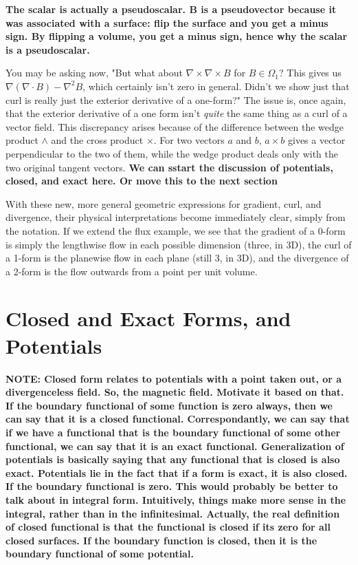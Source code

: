 \documentclass{book}
\begin{document}
\textbf{The scalar is actually a pseudoscalar. B is a pseudovector because it was associated with a surface: flip the surface and you get a minus sign. By flipping a volume, you get a minus sign, hence why the scalar is a pseudoscalar.}

You may be asking now, "But what about $\nabla \times \nabla \times B$ for $B \in \Omega_1$? This gives us $\nabla (\nabla \cdot B) - \nabla^2 B$, which certainly isn't zero in general. Didn't we show just that curl is really just the exterior derivative of a one-form?" The issue is, once again, that the exterior derivative of a one form isn't \emph{quite} the same thing as a curl of a vector field. This discrepancy arises because of the difference between the wedge product $\wedge$ and the cross product $\times$. For two vectors $a$ and $b$, $a \times b$ gives a vector perpendicular to the two of them, while the wedge product deals only with the two original tangent vectors. 
\textbf{We can sstart the discussion of potentials, closed, and exact here. Or move this to the next section}

With these new, more general geometric expressions for gradient, curl, and divergence, their physical interpretations become immediately clear, simply from the notation. If we extend the flux example, we see that the gradient of a 0-form is simply the lengthwise flow in each possible dimension (three, in 3D), the curl of a 1-form is the planewise flow in each plane (still 3, in 3D), and the divergence of a 2-form is the flow outwards from a point per unit volume. 



\section{Closed and Exact Forms, and Potentials}

\textbf{NOTE: Closed form relates to potentials with a point taken out, or a divergenceless field. So, the magnetic field. Motivate it based on that. If the boundary functional of some function is zero always, then we can say that it is a closed functional. Correspondantly, we can say that if we have a functional that is the boundary functional of some other functional, we can say that it is an exact functional. Generalization of potentials is basically saying that any functional that is closed is also exact. Potentials lie in the fact that if a form is exact, it is also closed. If the boundary functional is zero. This would probably be better to talk about in integral form. Intuitively, things make more sense in the integral, rather than in the infinitesimal. Actually, the real definition of closed functional is that the functional is closed if its zero for all closed surfaces. If the boundary function is closed, then it is the boundary functional of some potential.}
\end{document}
